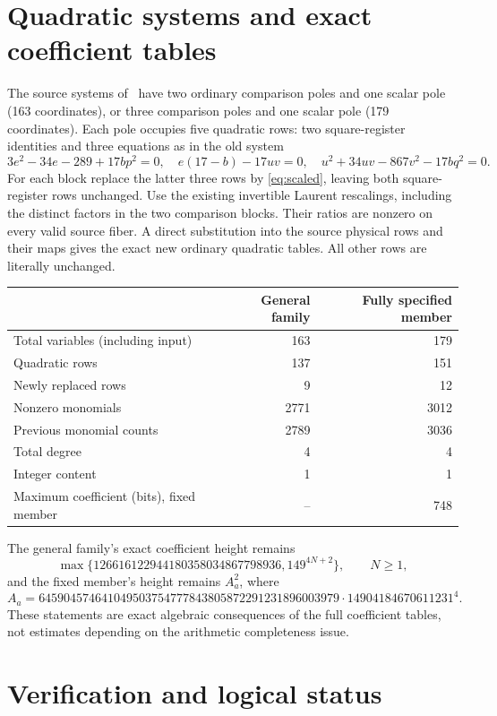 \documentclass[11pt,a4paper]{article}
\theoremstyle{remark}
\begin{document}
\section{Quadratic systems and exact coefficient tables}

The source systems of~\cite{V82} have two ordinary
comparison poles and one scalar pole (163 coordinates),
or three comparison poles and one scalar pole
(179 coordinates). Each pole occupies five quadratic
rows: two square-register identities and three equations
as in the old system
\[
 3e^2-34e-289+17bp^2=0,\quad
 e(17-b)-17uv=0,\quad
 u^2+34uv-867v^2-17bq^2=0.
\]
For each block replace the latter three rows by
\eqref{eq:scaled}, leaving both square-register rows
unchanged. Use the existing invertible Laurent rescalings,
including the distinct factors in the two comparison
blocks. Their ratios are nonzero on every valid
source fiber. A direct substitution into the source
physical rows and their maps gives the exact new ordinary
quadratic tables. All other rows are literally unchanged.

\begin{center}
\begin{tabular}{lrr}
\toprule
 & General family & Fully specified member\\
\midrule
Total variables (including input) & 163 & 179\\
Quadratic rows & 137 & 151\\
Newly replaced rows & 9 & 12\\
Nonzero monomials & 2771 & 3012\\
Previous monomial counts & 2789 & 3036\\
Total degree & 4 & 4\\
Integer content & 1 & 1\\
Maximum coefficient (bits), fixed member & -- & 748\\
\bottomrule
\end{tabular}
\end{center}

The general family's exact coefficient height remains
\[
 \max\{126616122944180358034867798936,149^{4N+2}\},
 \qquad N\ge1,
\]
and the fixed member's height remains $A_a^2$,
where
\[
 A_a=645904574641049503754777843805872291231896003979
       \cdot14904184670611231^4.
\]
These statements are exact algebraic consequences of
the full coefficient tables, not estimates depending
on the arithmetic completeness issue.

\section{Verification and logical status}
\end{document}
